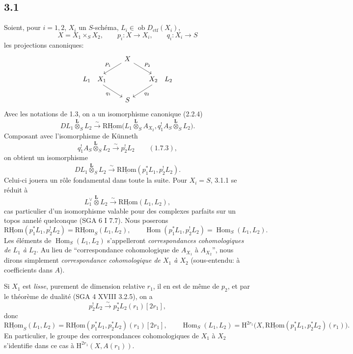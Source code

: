 \documentclass[11pt]{article}
\renewcommand{\H}{\mathrm{H}}
\DeclareMathOperator{\Hom}{Hom}
\newcommand{\ob}{\operatorname{ob}}
\providecommand{\RHom}{\mathrm{RHom}}
\providecommand{\uRHom}{\underline{\RHom}}
\providecommand{\Dctf}{D_{\mathrm{ctf}}}
\providecommand{\Dctf}{D_{\mathrm{ctf}}}
\providecommand{\RHom}{\mathrm{RHom}}
\providecommand{\Hom}{\operatorname{Hom}}
\providecommand{\ob}{\operatorname{ob}}
\providecommand{\RHom}{\mathrm R\mathcal{H}om}
\providecommand{\RHom}{\mathrm{RHom}}
\providecommand{\Hom}{\operatorname{Hom}}
\begin{document}
\subsection*{3.1}
Soient, pour $i=1,2$, $X_i$ un $S$-schéma, $L_i\in\ob\Dctf(X_i)$,
\[
X=X_1\times_S X_2,
\qquad
p_i:X\longrightarrow X_i,
\qquad
q_i:X_i\longrightarrow S
\]
les projections canoniques:
\[
\begin{tikzcd}[column sep=1.8em,row sep=1.5em]
& X \arrow[dl,"P_1"'] \arrow[dr,"P_2"] & \\
L_1\quad X_1 \arrow[dr,"q_1"'] & & X_2\quad L_2 \arrow[dl,"q_2"] \\
& S &
\end{tikzcd}
\]
Avec les notations de 1.3, on a un isomorphisme canonique (2.2.4)
\[
DL_1\overset{\mathbf L}{\otimes}_S L_2
\xrightarrow{\sim}
\uRHom\bigl(L_1\overset{\mathbf L}{\otimes}_S A_{X_2},
q_1^!A_S\overset{\mathbf L}{\otimes}_S L_2\bigr).
\]
Composant avec l'isomorphisme de Künneth
\[
q_1^!A_S\overset{\mathbf L}{\otimes}_S L_2
\xrightarrow{\sim}p_2^!L_2 \qquad (1.7.3),
\]
on obtient un isomorphisme
\begin{equation}
DL_1\overset{\mathbf L}{\otimes}_S L_2
\xrightarrow{\sim}
\uRHom(p_1^*L_1,p_2^!L_2).
\tag{3.1.1}
\end{equation}
Celui-ci jouera un rôle fondamental dans toute la suite. Pour $X_i=S$, 3.1.1 se réduit à
\[
L_1^\vee\overset{\mathbf L}{\otimes}L_2\xrightarrow{\sim}\uRHom(L_1,L_2),
\]
cas particulier d'un isomorphisme valable pour des complexes parfaits sur un topos annelé quelconque (SGA 6 I 7.7). Nous poserons
\begin{equation}
\uRHom(p_1^*L_1,p_2^!L_2)=\uRHom_S(L_1,L_2),
\qquad
\Hom(p_1^*L_1,p_2^!L_2)=\Hom_S(L_1,L_2).
\tag{3.1.2}
\end{equation}
Les éléments de $\Hom_S(L_1,L_2)$ s'appelleront \emph{correspondances cohomologiques de $L_1$ à $L_2$}. Au lieu de ``correspondance cohomologique de $A_{X_1}$ à $A_{X_2}$'', nous dirons simplement \emph{correspondance cohomologique de $X_1$ à $X_2$} (sous-entendu: à coefficients dans $A$).

Si $X_1$ est \emph{lisse}, purement de dimension relative $r_1$, il en est de même de $p_2$, et par le théorème de dualité (SGA 4 XVIII 3.2.5), on a
\[
p_2^!L_2\xrightarrow{\sim}p_2^*L_2(r_1)[2r_1],
\]
donc
\begin{equation}
\uRHom_S(L_1,L_2)=\uRHom(p_1^*L_1,p_2^*L_2)(r_1)[2r_1],
\qquad
\Hom_S(L_1,L_2)=\H^{2r_1}\bigl(X,\uRHom(p_1^*L_1,p_2^*L_2)(r_1)\bigr).
\tag{3.1.3}
\end{equation}
En particulier, le groupe des correspondances cohomologiques de $X_1$ à $X_2$ s'identifie dans ce cas à $\H^{2r_1}(X,A(r_1))$.
\end{document}
